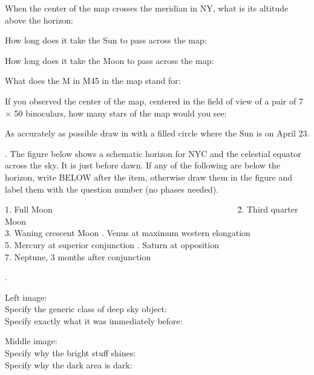 \documentclass[11pt]{article}
\begin{document}
\medskip
When the center of the map crosses the meridian in NY, what is its
altitude above the horizon:  \makebox[4cm]{\hrulefill} 

\medskip
How long does it take the Sun to pass across the map: 
\makebox[4cm]{\hrulefill} 

\medskip
How long does it take the Moon to pass across the map:
\makebox[4cm]{\hrulefill}  
 
\medskip 
What does the M in M45 in the map stand for: \makebox[4cm]{\hrulefill}

\medskip
If you observed the center of the map, centered in
the field of view of a  pair of 7 $\times$ 50
binoculars, how many stars of the map would you see: \makebox[4cm]{\hrulefill} 

\medskip
As accurately as possible draw in with a filled circle where the Sun
is on April 23.


. The figure below shows a schematic horizon for NYC and 
the celestial equator across the sky.
It is just before dawn. If any of the following are below the horizon,
write BELOW after the item, otherwise draw them in the figure and
label them with the question number (no phases needed).

\begin{tabbing}
1. Full Moon \ \ \ \ \ \ \ \ \ \ \ \ \ \ \ \ \ \ \ \ \ \ \  \ \ \ \ \
\ \ \ \ \ \ \ \ \ \ \ \ \ \ \    \=
2. Third quarter Moon \\
3. Waning crescent Moon . Venus at maximum western elongation \\
5. Mercury at superior conjunction . Saturn at opposition  \\
7. Neptune, 3 months after conjunction
\end{tabbing}
\vspace{7.0cm}

. 


Left image:\\
Specify the generic class of deep sky object: \makebox[3cm]{\hrulefill} \\
Specify exactly what it was immediately before:  \makebox[3cm]{\hrulefill}

\bigskip
Middle image: \\
Specify why the bright stuff shines:  \makebox[3cm]{\hrulefill}\\
Specify why the dark area is dark: \makebox[3cm]{\hrulefill}\\
\end{document}
